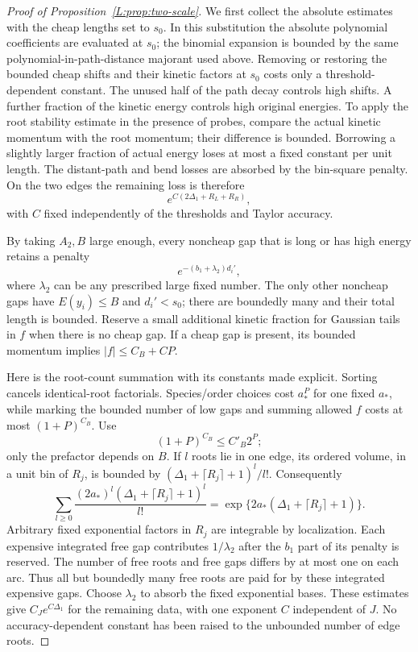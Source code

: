 \documentclass[11pt]{article}
\numberwithin{equation}{section}
\theoremstyle{definition}\newtheorem{definition}[theorem]{Definition}
\theoremstyle{remark}\newtheorem{remark}[theorem]{Remark}
\begin{document}
\begin{proof}[Proof of Proposition~\ref{L:prop:two-scale}]
We first collect the absolute estimates with the cheap lengths set
to $s_0$. In this substitution the absolute polynomial coefficients
are evaluated at $s_0$; the binomial expansion is bounded by the same
polynomial-in-path-distance majorant used above. Removing or restoring
the bounded cheap shifts and their kinetic factors at $s_0$ costs only
a threshold-dependent constant. The unused half of the path decay
controls high shifts. A further fraction of the kinetic energy
controls high original energies. To apply the root stability estimate
in the presence of probes, compare the actual kinetic momentum with
the root momentum; their difference is bounded. Borrowing a slightly
larger fraction of actual energy loses at most a fixed constant per
unit length. The distant-path and bend losses are absorbed by the
bin-square penalty. On the two edges the remaining loss is therefore
\[
              e^{C(2\Delta_1+R_L+R_R)},
\]
with $C$ fixed independently of the thresholds and Taylor accuracy.

By taking $A_2,B$ large enough, every noncheap gap that is long or
has high energy retains a penalty
\[
                   e^{-(b_1+\lambda_2)d_i'},
\]
where $\lambda_2$ can be any prescribed large fixed number. The only
other noncheap gaps have $E(y_i)\le B$ and $d_i'<s_0$; there are
boundedly many and their total length is bounded. Reserve a small
additional kinetic fraction for Gaussian tails in $f$ when there is
no cheap gap. If a cheap gap is present, its bounded momentum implies
$|f|\le C_B+CP$.

Here is the root-count summation with its constants made explicit.
Sorting cancels identical-root factorials. Species/order choices cost
$a_*^P$ for one fixed $a_*$, while marking the bounded number of low gaps
and summing allowed $f$ costs at most $(1+P)^{C_B}$. Use
\[
       (1+P)^{C_B}\le C'_B2^P;
\]
only the prefactor depends on $B$. If $l$ roots lie in one edge,
its ordered volume, in a unit bin of $R_j$, is bounded by
$(\Delta_1+\lceil R_j\rceil+1)^l/l!$. Consequently
\[
 \sum_{l\ge0}\frac{(2a_*)^l(\Delta_1+\lceil R_j\rceil+1)^l}{l!}
 =\exp\{2a_*(\Delta_1+\lceil R_j\rceil+1)\}.
\]
Arbitrary fixed exponential factors in $R_j$ are integrable by
localization. Each expensive integrated free gap contributes
$1/\lambda_2$ after the $b_1$ part of its penalty is reserved.
The number of free roots and free gaps differs by at most one on each
arc. Thus all but boundedly many free roots are paid for by these
integrated expensive gaps. Choose $\lambda_2$
to absorb the fixed exponential bases. These estimates give
$C_J e^{C\Delta_1}$ for the remaining data, with one exponent $C$
independent of $J$. No accuracy-dependent constant has been raised
to the unbounded number of edge roots.


\end{proof}
\end{document}
